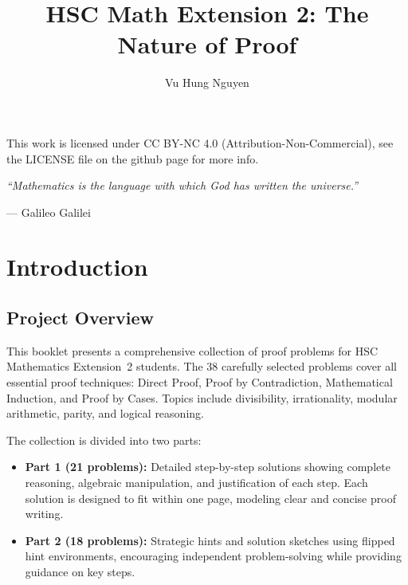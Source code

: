 \documentclass[12pt]{article}
\author{Vu Hung Nguyen}
\title{HSC Math Extension 2: The Nature of Proof}
\date{}
\begin{document}


\newpage
\thispagestyle{empty}


\begingroup\small\noindent This work is licensed under CC BY-NC 4.0 (Attribution-Non-Commercial), see the LICENSE file on the github page for more info.\par\endgroup

\newpage
\thispagestyle{empty}
\vspace*{\fill}
\begin{center}
\itshape
``Mathematics is the language with which God has written the universe.''

\vspace{1em}
\normalfont --- Galileo Galilei
\end{center}
\vspace*{\fill}

\newpage
\tableofcontents
\newpage

\section{Introduction}

\subsection{Project Overview}
This booklet presents a comprehensive collection of proof problems for HSC Mathematics Extension~2 students. The 38 carefully selected problems cover all essential proof techniques: Direct Proof, Proof by Contradiction, Mathematical Induction, and Proof by Cases. Topics include divisibility, irrationality, modular arithmetic, parity, and logical reasoning.

The collection is divided into two parts:
\begin{itemize}[leftmargin=*]
  \item \textbf{Part 1 (21 problems):} Detailed step-by-step solutions showing complete reasoning, algebraic manipulation, and justification of each step. Each solution is designed to fit within one page, modeling clear and concise proof writing.
  \item \textbf{Part 2 (18 problems):} Strategic hints and solution sketches using flipped hint environments, encouraging independent problem-solving while providing guidance on key steps.
\end{itemize}
\end{document}
